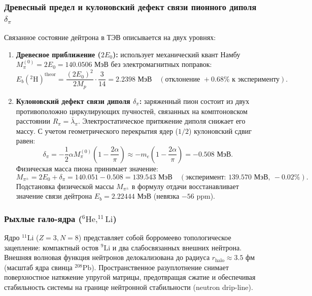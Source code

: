 \documentclass[11pt,a4paper]{article}
\providecommand{\lambdabar}{\bar{\lambda}}
\theoremstyle{definition}
\theoremstyle{remark}
\begin{document}
\subsubsection{Древесный предел и кулоновский дефект связи пионного диполя $\delta_\pi$}

Связанное состояние дейтрона в ТЭВ описывается на двух уровнях:
\begin{enumerate}
\item \textbf{Древесное приближение ($2E_0$):} использует механический квант Намбу $M_\pi^{(0)} = 2E_0 = 140.0506\text{ МэВ}$ без электромагнитных поправок:
\begin{equation}
	E_b(^2\mathrm{H})^{\mathrm{theor}} = \frac{(2E_0)^2}{2 M_p} \cdot \frac{3}{14} = 2.2398\text{ МэВ} \quad (\text{отклонение } +0.68\% \text{ к эксперименту}).
\label{eq:deuteron_tree_binding}
\end{equation}
\item \textbf{Кулоновский дефект связи диполя $\delta_\pi$:} заряженный пион состоит из двух противоположно циркулирующих пучностей, связанных на комптоновском расстоянии $R_\pi = \lambdabar_\pi$. Электростатическое притяжение диполя снижает его массу. С учетом геометрического перекрытия ядер ($1/2$) кулоновский сдвиг равен:
\begin{equation}
	\delta_\pi = -\frac{1}{2} \alpha M_\pi^{(0)} \left(1 - \frac{2\alpha}{\pi}\right) \approx -m_e \left(1 - \frac{2\alpha}{\pi}\right) = -0.508\text{ МэВ}.
\label{eq:pion_coulomb_defect_val}
\end{equation}
Физическая масса пиона принимает значение:
\begin{equation}
	M_{\pi^\pm} = 2E_0 + \delta_\pi = 140.051 - 0.508 = 139.543\text{ МэВ} \quad (\text{эксперимент: } 139.570\text{ МэВ}, \ -0.02\%).
\label{eq:pion_dressed_mass_formula}
\end{equation}
Подстановка физической массы $M_{\pi^\pm}$ в формулу отдачи восстанавливает значение связи дейтрона $E_b = 2.22444\text{ МэВ}$ (невязка $-56\text{ ppm}$).
\end{enumerate}

\subsubsection{Рыхлые гало-ядра ($^6\mathrm{He}, ^{11}\mathrm{Li}$)}

Ядро $^{11}\mathrm{Li}$ ($Z=3, N=8$) представляет собой борромеево топологическое зацепление: компактный остов $^9\mathrm{Li}$ и два слабосвязанных внешних нейтрона. Внешняя волновая функция нейтронов делокализована до радиуса $r_{\mathrm{halo}} \approx 3.5\text{ фм}$ (масштаб ядра свинца $^{208}\mathrm{Pb}$). Пространственное разуплотнение снимает поверхностное натяжение упругой матрицы, предотвращая сжатие и обеспечивая стабильность системы на границе нейтронной стабильности (neutron drip-line).
\end{document}
